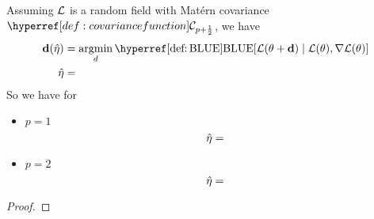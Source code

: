 \begin{theorem}
	Assuming \(\mathcal{L}\) is a random field with Matérn covariance
	\(\C_{p+\frac12}\), we have
	\begin{align*}
		\step(\hat{\lr})
		&= \argmin_{d}
		\BLUE[\Loss(\param + \step) \mid \Loss(\param), \grad\Loss(\param)]\\
		\hat{\lr}
		&=
	\end{align*}
	So we have for
	\begin{itemize}
		\item \(p=1\)
		\begin{equation*}
			\hat{\eta}
			=
		\end{equation*}

		\item \(p=2\)
		\begin{equation*}
			\hat{\eta}
			=
		\end{equation*}
	\end{itemize}
\end{theorem}
\begin{proof}
	
\end{proof}

